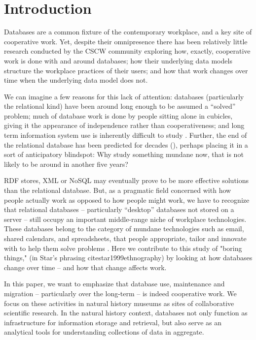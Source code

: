 \section{Introduction}

Databases are a common fixture of the contemporary workplace, and a key site of cooperative work. Yet, despite their omnipresence there has been relatively little research conducted by the CSCW community exploring how, exactly, cooperative work is done with and around databases;  how their underlying data models structure the workplace practices of their users; and how that work changes over time when the underlying data model does not. 

We can imagine a few reasons for this lack of attention: databases (particularly the relational kind) have been around long enough to be assumed a “solved” problem; much of database work is done by people sitting alone in cubicles, giving it the appearance of independence rather than cooperativeness; and long term information system use is inherently difficult to study \cite{Pipek_2002}. Further, the end of the relational database has been predicted for decades (\cite{Atzeni_2013}), perhaps placing it in a sort of anticipatory blindspot: Why study something mundane now, that is not likely to be around in another five years? 

RDF stores, XML or NoSQL may eventually prove to be more effective solutions than the relational database. But, as a pragmatic field concerned with how people actually work as opposed to how people might work, we have to recognize that relational databases – particularly “desktop” databases not stored on a server – still occupy an important middle-range niche of workplace technologies. These databases belong to the category of mundane technologies such as email, shared calendars, and spreadsheets, that people appropriate, tailor and innovate with   to help them solve problems  \cite{bellotti2005quality, palen1999social, nardi1991twinkling}. Here we contribute to this study of "boring things," (in Star's phrasing cite{star1999ethnography}) by looking at how databases change over time -- and how that change affects work.

In this paper, we want to emphasize that database use, maintenance and migration – particularly over the long-term – is indeed cooperative work. We focus on these activities in natural history museums as sites of collaborative scientific research. In the natural history context, databases not only function as infrastructure for information storage and retrieval, but also serve as an analytical tools for understanding collections of data in aggregate. 

